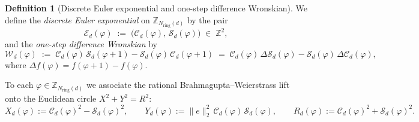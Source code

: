 \documentclass[11pt,a4paper]{article}
\theoremstyle{plain}
\theoremstyle{definition}
\newtheorem{definition}[theorem]{Definition}
\begin{document}
\begin{definition}[Discrete Euler exponential and one-step difference Wronskian]
\label{def:euler-exp-wronskian}
We define the \emph{discrete Euler exponential} on $\mathbb{Z}_{N_{\mathrm{ring}}(d)}$ by the pair
\[
  \mathcal{E}_d(\varphi) \;:=\; \bigl(\mathcal{C}_d(\varphi),\,\mathcal{S}_d(\varphi)\bigr) \;\in\; \mathbb{Z}^2,
\]
and the \emph{one-step difference Wronskian} by
\begin{equation}
  \label{eq:rotator-wronskian}
  \mathcal{W}_d(\varphi) \;:=\; \mathcal{C}_d(\varphi)\,\mathcal{S}_d(\varphi+1) - \mathcal{S}_d(\varphi)\,\mathcal{C}_d(\varphi+1)
  \;=\; \mathcal{C}_d(\varphi)\,\Delta\mathcal{S}_d(\varphi) - \mathcal{S}_d(\varphi)\,\Delta\mathcal{C}_d(\varphi),
\end{equation}
where $\Delta f(\varphi) = f(\varphi+1)-f(\varphi)$.
\end{definition}

To each $\varphi\in\mathbb{Z}_{N_{\mathrm{ring}}(d)}$ we associate the rational Brahmagupta--Weierstrass lift onto the Euclidean circle $X^2+Y^2=R^2$:
\begin{equation}
  \label{eq:weierstrass-lift}
  X_d(\varphi) := \mathcal{C}_d(\varphi)^2 - \mathcal{S}_d(\varphi)^2,\qquad
  Y_d(\varphi) := \|e\|_2^2\,\mathcal{C}_d(\varphi)\,\mathcal{S}_d(\varphi),\qquad
  R_d(\varphi) := \mathcal{C}_d(\varphi)^2 + \mathcal{S}_d(\varphi)^2.
\end{equation}
\end{document}
